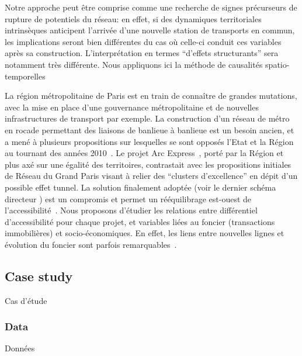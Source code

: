 Notre approche peut être comprise comme une recherche de signes précurseurs de rupture de potentiels du réseau: en effet, si des dynamiques territoriales intrinsèques anticipent l'arrivée d'une nouvelle station de transports en commun, les implications seront bien différentes du cas où celle-ci conduit ces variables après sa construction. L'interprétation en termes ``d'effets structurants'' sera notamment très différente. Nous appliquons ici la méthode de causalités spatio-temporelles

La région métropolitaine de Paris est en train de connaître de grandes mutations, avec la mise en place d'une gouvernance métropolitaine et de nouvelles infrastructures de transport par exemple. La construction d'un réseau de métro en rocade permettant des liaisons de banlieue à banlieue est un besoin ancien, et a mené à plusieurs propositions sur lesquelles se sont opposés l'Etat et la Région au tournant des années 2010~\cite{desjardins2010bataille}. Le projet Arc Express~\cite{stif2007arc}, porté par la Région et plus axé sur une égalité des territoires, contrastait avec les propositions initiales de Réseau du Grand Paris visant à relier des ``clusters d'excellence'' en dépit d'un possible effet tunnel. La solution finalement adoptée (voir le dernier schéma directeur \cite{sdrif2013}) est un compromis et permet un rééquilibrage est-ouest de l'accessibilité~\cite{beaucire2013grand}. Nous proposons d'étudier les relations entre différentiel d'accessibilité pour chaque projet, et variables liées au foncier (transactions immobilières) et socio-économiques. En effet, les liens entre nouvelles lignes et évolution du foncier sont parfois remarquables~\cite{damm1980response}.





\subsection{Case study}{Cas d'étude}





\subsubsection{Data}{Données}

